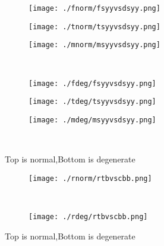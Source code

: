 \documentclass[aps,floats,floatfix,nofootinbib]{revtex4-1}
\begin{document}
\begin{center}
\begin{figure}
\begin{subfigure}{0.3\textwidth}
\texttt{[image: ./fnorm/fsyyvsdsyy.png]}
\label{}
\end{subfigure}
\begin{subfigure}{0.3\textwidth}
\texttt{[image: ./tnorm/tsyyvsdsyy.png]}
\label{}
\end{subfigure}
\begin{subfigure}{0.3\textwidth}
\texttt{[image: ./mnorm/msyyvsdsyy.png]}
\label{}
\end{subfigure}\\
\begin{subfigure}{0.3\textwidth}
\texttt{[image: ./fdeg/fsyyvsdsyy.png]}
\label{}
\end{subfigure}
\begin{subfigure}{0.3\textwidth}
\texttt{[image: ./tdeg/tsyyvsdsyy.png]}
\label{}
\end{subfigure}
\begin{subfigure}{0.3\textwidth}
\texttt{[image: ./mdeg/msyyvsdsyy.png]}
\label{}
\end{subfigure}\\
\caption{Top is normal,Bottom is degenerate}
\end{figure}
\end{center}

\begin{center}
\begin{figure}
\begin{subfigure}{0.95\textwidth}
\texttt{[image: ./rnorm/rtbvscbb.png]}
\label{}
\end{subfigure}\\
\begin{subfigure}{0.95\textwidth}
\texttt{[image: ./rdeg/rtbvscbb.png]}
\label{}
\end{subfigure}
\caption{Top is normal,Bottom is degenerate}
\end{figure}
\end{center}
\end{document}
